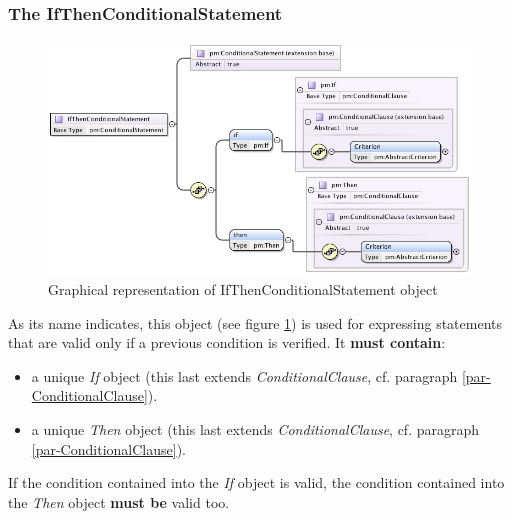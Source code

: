 \documentclass[a4paper,11pt] {article}
\begin{document}
\subsubsection{The IfThenConditionalStatement}\label{par-IfThenConditionalStatement}
\begin{figure}[htbp]
\begin{center}
\includegraphics[width=1.0\textwidth]{pictures/IfThenStatement.jpg} 
\caption{Graphical representation of IfThenConditionalStatement object}
\label{Pic-IfThenConditionalStatement}
\end{center}
\end{figure}
As its name indicates, this object (see figure \ref{Pic-IfThenConditionalStatement}) is used for
expressing statements that are valid only if a previous condition is verified. It {\bf must
contain}:
\begin{itemize}
\item a unique {\it If} object (this last extends {\it ConditionalClause}, cf. paragraph \ref{par-ConditionalClause}).
\item a unique {\it Then} object (this last extends {\it ConditionalClause}, cf. paragraph \ref{par-ConditionalClause}).
\end{itemize}
If the condition contained into the {\it If} object is valid, the condition contained into the {\it Then} object {\bf must be} valid too.
\end{document}
